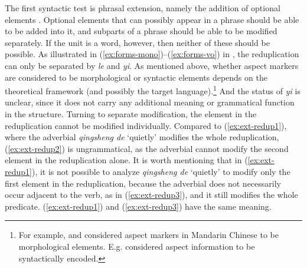 The first syntactic test is phrasal extension, namely the addition of optional elements \citetext{\citealp[150]{Duanmu1998}; \citealp[280]{Schaefer2009}}. 
Optional elements that can possibly appear in a phrase should be able to be added into it,
and subparts of a phrase should be able to be modified separately. 
If the unit is a word, however, then neither of these should  be possible.
As illustrated in (\ref{ex:forms-mono})--(\ref{ex:forms-vo}) in , the reduplication can only be separated by \textit{le} and \textit{yi}. 
As mentioned above, whether aspect markers are considered to be morphological or syntactic elements depends on the theoretical framework (and possibly the target language).\footnote{For example, \citet{Huangetal2009} and \citet{MuellerLipenkova2013} considered aspect markers in Mandarin Chinese to be morphological elements. E.g. \citet{Travis2000, Arcodiaetal2014, BascianoMelloni2017} considered aspect information to be syntactically encoded.} 
And the status of \textit{yi} is unclear, since it does not carry any additional meaning or grammatical function in the structure. %
Turning to separate modification,  the element in the reduplication cannot be modified individually. 
Compared to (\ref{ex:ext-redup1}), where the adverbial \textit{qingsheng de} `quietly' modifies the whole reduplication, (\ref{ex:ext-redup2}) is ungrammatical, 
as the adverbial cannot modify the second element in the reduplication alone.
It is worth mentioning that in (\ref{ex:ext-redup1}), it is not possible to analyze \textit{qingsheng de} `quietly' to modify only the first element in the reduplication, 
because the adverbial does not necessarily occur adjacent to the verb, as in (\ref{ex:ext-redup3}), 
and it still modifies the whole predicate.
(\ref{ex:ext-redup1}) and  (\ref{ex:ext-redup3}) have the same meaning.

\ea
  
  
  \z
\z

